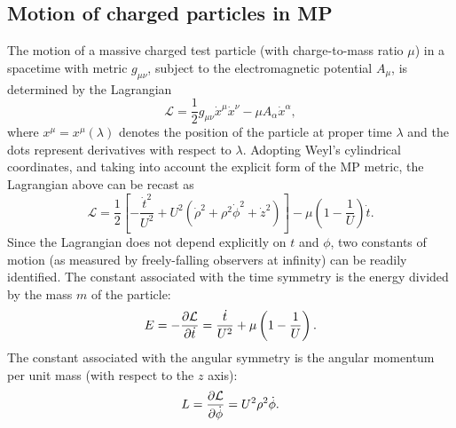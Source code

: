\subsection{Motion of charged particles in MP}
\label{sec:motion}

The motion of a massive charged test particle (with charge-to-mass ratio $\mu$) in a spacetime with metric $g_{\mu \nu}$, subject to the electromagnetic potential $A_{\mu}$, is determined by the Lagrangian
\begin{equation}
  \mathcal{L} = \frac{1}{2}g_{\mu \nu}\dot{x}^\mu \dot{x}^\nu - \mu A_{\alpha}\dot{x}^\alpha,
  \label{eq:lagrangian_for_charged_particle}
\end{equation}
where $x^{\mu} = x^{\mu}(\lambda)$ denotes the position of the particle at proper time $\lambda$ and the dots represent derivatives with respect to $\lambda$. Adopting Weyl's cylindrical coordinates, and taking into account the explicit form of the MP metric, the Lagrangian above can be recast as~\cite{RYZNER2015}
%
\begin{equation}
  \mathcal{L} = \frac{1}{2}\left[-\frac{\dot{t}^2}{U^2} + U^2\left( \dot{\rho}^2 + \rho^2\dot{\phi}^2 + \dot{z}^2 \right) \right] - \mu\left(1-\frac{1}{U}\right)\dot{t}.
  \label{eq:explicit_lagrangian_for_charged_particle}
\end{equation}
%
Since the Lagrangian does not depend explicitly on $t$ and $\phi$, two constants of motion (as measured by freely-falling observers at infinity) can be readily identified. The constant associated with the time symmetry is the energy divided by the mass $m$ of the particle:
%
\begin{equation}
  E = -\frac{\partial \mathcal{L}}{\partial \dot{t}} = \frac{\dot{t}}{U^2} + \mu\left(1-\frac{1}{U}\right).
  \label{eq:conserved_energy}
\end{equation}
%
The constant associated with the angular symmetry is the angular momentum per unit mass (with respect to the $z$ axis):
%
\begin{equation}
  L = \frac{\partial \mathcal{L}}{\partial \dot{\phi}} = U^2 \rho^2 \dot{\phi}.
  \label{eq:conserved_momentum}
\end{equation}

